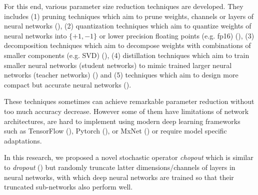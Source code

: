 \documentclass{article}
\begin{document}
    For this end, various parameter size reduction techniques are developed. They includes 
    (1) pruning techniques which aim to prune weights, channels or layers of neural networks (\citet{han2015deep, aghasi2017nettrim, dong2017learning, molchanov2016pruning, li2017pruning, luo2017thinet, ye2018rethinking, liu2017learning, he2017channel}), 
    (2) quantization techniques which aim to quantize weights of neural networks into $\{+1, -1\}$ or lower precision floating points (e.g. fp16) (\citet{han2015learning, courbariaux2015binaryconnect, rastegari2016xnor, zhou2016dorefa, zhu2016trained,  wu2016quantized, hubara2017quantized}), 
    (3) decomposition techniques which aim to decompose weights with combinations of smaller components (e.g. SVD) (\citet{denton2014exploiting, jaderberg2014speeding, lebedev2014speeding, yang2015deep, novikov2015tensorizing}), 
    (4) distillation techniques which aim to train smaller neural networks (student networks) to mimic trained larger neural networks (teacher networks) (\citet{hinton2015distilling, mishra2017apprentice, polino2018model}) and 
    (5) techniques which aim to design more compact but accurate neural networks (\citet{iandola2016squeezenet, howard2017mobilenet, sandler2018mobilenetv2, zhang2017shufflenet}).

    These techniques sometimes can achieve remarkable parameter reduction without too much accuracy decrease. However some of them have limitations of network architectures, are hard to implement using modern deep learning frameworks such as TensorFlow (\citet{abadi2016tensorflow}), Pytorch (\citet{paszke2017automatic}), or MxNet (\citet{chen2015mxnet}) or require model specific adaptations.

    In this research, we proposed a novel stochastic operator \textit{chopout} which is similar to \textit{dropout} (\citet{srivastava2014dropout}) but randomly truncate latter dimensions/channels of layers in neural networks, with which deep neural networks are trained so that their truncated sub-networks also perform well. 

    
\end{document}
